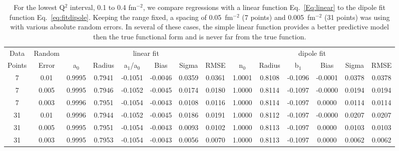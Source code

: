 \documentclass[10pt,aps,prc,twocolumn]{revtex4-1}
\begin{document}
\begin{table}
\caption{For the lowest Q$^2$ interval, 0.1 to 0.4 fm$^{-2}$, we compare regressions with
a linear function Eq.~\ref{Eq:linear} to the dipole fit function Eq.~\ref{eq:fitdipole}.   Keeping the range
fixed, a spacing of 0.05~fm$^{-2}$ (7 points) and 0.005~fm$^{-2}$ (31 points) was using
with various absolute random errors.  In several of these cases, the simple linear 
function provides a better predictive model then the true functional form and is never 
far from the true function.}
\begin{tabular}{cc|cccccc|cccccc} \hline
Data   & Random   & \multicolumn{6}{c|}{linear fit}                       & \multicolumn{6}{c}{dipole fit}            \\ 
Points & Error    & a$_0$ & Radius&a$_1$/a$_0$&  Bias  & Sigma &  RMSE  & n$_0$ & Radius& b$_1$  &  Bias  & Sigma &  RMSE   \\  \hline
7      & 0.01     & 0.9995& 0.7941& -0.1051& -0.0046& 0.0359& 0.0361 & 1.0001& 0.8108& -0.1096& -0.0001& 0.0378& 0.0378  \\ 
7      & 0.005    & 0.9995& 0.7946& -0.1052& -0.0045& 0.0174& 0.0180 & 1.0000& 0.8114& -0.1097& -0.0000& 0.0194& 0.0194  \\
7      & 0.003    & 0.9996& 0.7951& -0.1054& -0.0043& 0.0108& 0.0116 & 1.0000& 0.8114& -0.1097&  0.0000& 0.0114& 0.0114  \\
31     & 0.01     & 0.9996& 0.7944& -0.1052& -0.0045& 0.0186& 0.0191 & 1.0000& 0.8112& -0.1097& -0.0000& 0.0207& 0.0207  \\
31     & 0.005    & 0.9995& 0.7951& -0.1054& -0.0043& 0.0093& 0.0102 & 1.0000& 0.8113& -0.1097&  0.0000& 0.0103& 0.0103  \\
31     & 0.003    & 0.9995& 0.7953& -0.1054& -0.0043& 0.0056& 0.0070 & 1.0000& 0.8113& -0.1097&  0.0000& 0.0062& 0.0062   \\ \hline 
\end{tabular}
\label{simpleVSperfect}
\end{table}
\end{document}
